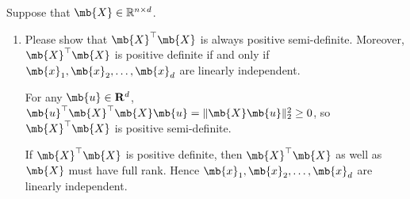 \begin{exercise}
    Suppose that $\mb{X}\in \mathbb{R}^{n\times d}$.
    \begin{enumerate}
        \item Please show that $\mb{X}^{\top}\mb{X}$ is always positive semi-definite. Moreover, $\mb{X}^{\top}\mb{X}$ is positive definite if and only if $\mb{x}_1, \mb{x}_2, \dots, \mb{x}_d$ are linearly independent.
            \begin{solution}
                For any $\mb{u}\in\mathbf{R}^d$, $\mb{u}^\top\mb{X}^{\top}\mb{X}\mb{u} = \|\mb{X}\mb{u}\|^2_2 \ge 0$, so $\mb{X}^{\top}\mb{X}$ is positive semi-definite.
                
                If $\mb{X}^{\top}\mb{X}$ is positive definite, then $\mb{X}^\top\mb{X}$ as well as $\mb{X}$ must have full rank. Hence $\mb{x}_1, \mb{x}_2, \dots, \mb{x}_d$ are linearly independent.
                

\end{solution}
\end{enumerate}
\end{exercise}
